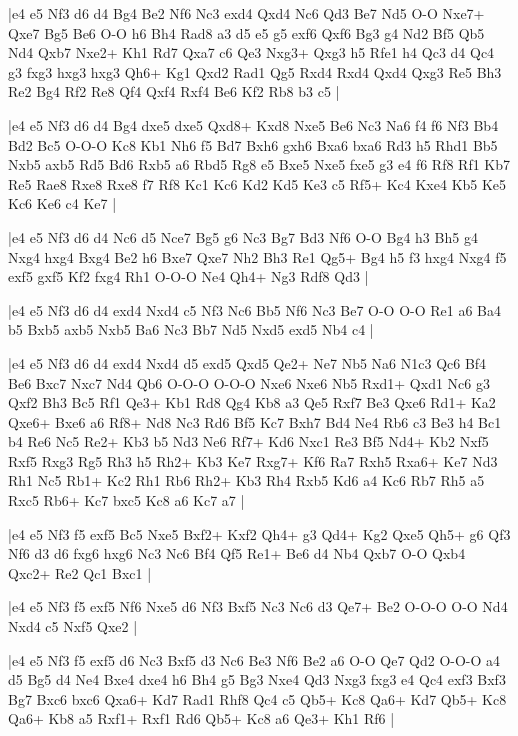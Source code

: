 \whitename{}
\blackname{}
\makegametitle
|e4 e5 Nf3 d6 d4 Bg4 Be2 Nf6 Nc3 exd4 Qxd4 Nc6 Qd3 Be7 Nd5 O-O Nxe7+ Qxe7 Bg5 Be6 O-O h6 Bh4 Rad8 a3 d5 e5 g5 exf6 Qxf6 Bg3 g4 Nd2 Bf5 Qb5 Nd4 Qxb7 Nxe2+ Kh1 Rd7 Qxa7 c6 Qe3 Nxg3+ Qxg3 h5 Rfe1 h4 Qc3 d4 Qc4 g3 fxg3 hxg3 hxg3 Qh6+ Kg1 Qxd2 Rad1 Qg5 Rxd4 Rxd4 Qxd4 Qxg3 Re5 Bh3 Re2 Bg4 Rf2 Re8 Qf4 Qxf4 Rxf4 Be6 Kf2 Rb8 b3 c5  |

\whitename{}
\blackname{}
\makegametitle
|e4 e5 Nf3 d6 d4 Bg4 dxe5 dxe5 Qxd8+ Kxd8 Nxe5 Be6 Nc3 Na6 f4 f6 Nf3 Bb4 Bd2 Bc5 O-O-O Kc8 Kb1 Nh6 f5 Bd7 Bxh6 gxh6 Bxa6 bxa6 Rd3 h5 Rhd1 Bb5 Nxb5 axb5 Rd5 Bd6 Rxb5 a6 Rbd5 Rg8 e5 Bxe5 Nxe5 fxe5 g3 e4 f6 Rf8 Rf1 Kb7 Re5 Rae8 Rxe8 Rxe8 f7 Rf8 Kc1 Kc6 Kd2 Kd5 Ke3 c5 Rf5+ Kc4 Kxe4 Kb5 Ke5 Kc6 Ke6 c4 Ke7  |

\whitename{}
\blackname{}
\makegametitle
|e4 e5 Nf3 d6 d4 Nc6 d5 Nce7 Bg5 g6 Nc3 Bg7 Bd3 Nf6 O-O Bg4 h3 Bh5 g4 Nxg4 hxg4 Bxg4 Be2 h6 Bxe7 Qxe7 Nh2 Bh3 Re1 Qg5+ Bg4 h5 f3 hxg4 Nxg4 f5 exf5 gxf5 Kf2 fxg4 Rh1 O-O-O Ne4 Qh4+ Ng3 Rdf8 Qd3  |

\whitename{}
\blackname{}
\makegametitle
|e4 e5 Nf3 d6 d4 exd4 Nxd4 c5 Nf3 Nc6 Bb5 Nf6 Nc3 Be7 O-O O-O Re1 a6 Ba4 b5 Bxb5 axb5 Nxb5 Ba6 Nc3 Bb7 Nd5 Nxd5 exd5 Nb4 c4  |

\whitename{}
\blackname{}
\makegametitle
|e4 e5 Nf3 d6 d4 exd4 Nxd4 d5 exd5 Qxd5 Qe2+ Ne7 Nb5 Na6 N1c3 Qc6 Bf4 Be6 Bxc7 Nxc7 Nd4 Qb6 O-O-O O-O-O Nxe6 Nxe6 Nb5 Rxd1+ Qxd1 Nc6 g3 Qxf2 Bh3 Bc5 Rf1 Qe3+ Kb1 Rd8 Qg4 Kb8 a3 Qe5 Rxf7 Be3 Qxe6 Rd1+ Ka2 Qxe6+ Bxe6 a6 Rf8+ Nd8 Nc3 Rd6 Bf5 Kc7 Bxh7 Bd4 Ne4 Rb6 c3 Be3 h4 Bc1 b4 Re6 Nc5 Re2+ Kb3 b5 Nd3 Ne6 Rf7+ Kd6 Nxc1 Re3 Bf5 Nd4+ Kb2 Nxf5 Rxf5 Rxg3 Rg5 Rh3 h5 Rh2+ Kb3 Ke7 Rxg7+ Kf6 Ra7 Rxh5 Rxa6+ Ke7 Nd3 Rh1 Nc5 Rb1+ Kc2 Rh1 Rb6 Rh2+ Kb3 Rh4 Rxb5 Kd6 a4 Kc6 Rb7 Rh5 a5 Rxc5 Rb6+ Kc7 bxc5 Kc8 a6 Kc7 a7  |

\whitename{}
\blackname{}
\makegametitle
|e4 e5 Nf3 f5 exf5 Bc5 Nxe5 Bxf2+ Kxf2 Qh4+ g3 Qd4+ Kg2 Qxe5 Qh5+ g6 Qf3 Nf6 d3 d6 fxg6 hxg6 Nc3 Nc6 Bf4 Qf5 Re1+ Be6 d4 Nb4 Qxb7 O-O Qxb4 Qxc2+ Re2 Qc1 Bxc1  |

\whitename{}
\blackname{}
\makegametitle
|e4 e5 Nf3 f5 exf5 Nf6 Nxe5 d6 Nf3 Bxf5 Nc3 Nc6 d3 Qe7+ Be2 O-O-O O-O Nd4 Nxd4 c5 Nxf5 Qxe2  |

\whitename{}
\blackname{}
\makegametitle
|e4 e5 Nf3 f5 exf5 d6 Nc3 Bxf5 d3 Nc6 Be3 Nf6 Be2 a6 O-O Qe7 Qd2 O-O-O a4 d5 Bg5 d4 Ne4 Bxe4 dxe4 h6 Bh4 g5 Bg3 Nxe4 Qd3 Nxg3 fxg3 e4 Qc4 exf3 Bxf3 Bg7 Bxc6 bxc6 Qxa6+ Kd7 Rad1 Rhf8 Qc4 c5 Qb5+ Kc8 Qa6+ Kd7 Qb5+ Kc8 Qa6+ Kb8 a5 Rxf1+ Rxf1 Rd6 Qb5+ Kc8 a6 Qe3+ Kh1 Rf6  |

